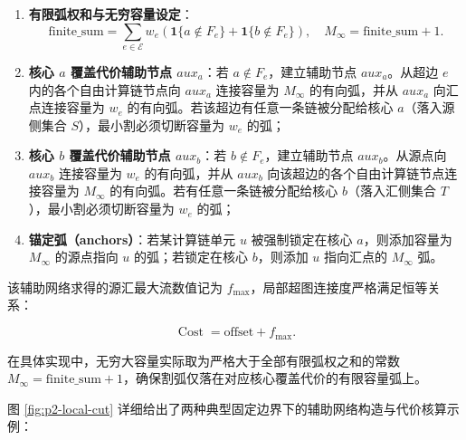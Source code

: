 \documentclass[anonymous,withtoc]{gmcm2026}
\providecommand{\tightlist}{\setlength{\itemsep}{0pt}\setlength{\parskip}{0pt}}
\begin{document}
\begin{enumerate}
\def\labelenumi{\arabic{enumi}.}
\tightlist
\item
  \textbf{有限弧权和与无穷容量设定}： \begin{equation}
\text{finite\_sum} = \sum_{e \in \mathcal{E}} w_e \left( \mathbf{1}\{a \notin F_e\} + \mathbf{1}\{b \notin F_e\} \right), \quad M_\infty = \text{finite\_sum} + 1.
\end{equation}
\item
  \textbf{核心 \(a\) 覆盖代价辅助节点 \(aux_a\)}：若 \(a \notin F_e\)，建立辅助节点 \(aux_a\)。从超边 \(e\) 内的各个自由计算链节点向 \(aux_a\) 连接容量为 \(M_\infty\) 的有向弧，并从 \(aux_a\) 向汇点连接容量为 \(w_e\) 的有向弧。若该超边有任意一条链被分配给核心 \(a\)（落入源侧集合 \(S\)），最小割必须切断容量为 \(w_e\) 的弧；
\item
  \textbf{核心 \(b\) 覆盖代价辅助节点 \(aux_b\)}：若 \(b \notin F_e\)，建立辅助节点 \(aux_b\)。从源点向 \(aux_b\) 连接容量为 \(w_e\) 的有向弧，并从 \(aux_b\) 向该超边的各个自由计算链节点连接容量为 \(M_\infty\) 的有向弧。若有任意一条链被分配给核心 \(b\)（落入汇侧集合 \(T\)），最小割必须切断容量为 \(w_e\) 的弧；
\item
  \textbf{锚定弧（anchors）}：若某计算链单元 \(u\) 被强制锁定在核心 \(a\)，则添加容量为 \(M_\infty\) 的源点指向 \(u\) 的弧；若锁定在核心 \(b\)，则添加 \(u\) 指向汇点的 \(M_\infty\) 弧。
\end{enumerate}

该辅助网络求得的源汇最大流数值记为 \(f_{\max}\)，局部超图连接度严格满足恒等关系：

\begin{equation}
\operatorname{Cost} = \text{offset} + f_{\max}.
\end{equation}

在具体实现中，无穷大容量实际取为严格大于全部有限弧权之和的常数 \(M_\infty = \text{finite\_sum} + 1\)，确保割弧仅落在对应核心覆盖代价的有限容量弧上。

图 \ref{fig:p2-local-cut} 详细给出了两种典型固定边界下的辅助网络构造与代价核算示例：
\end{document}
